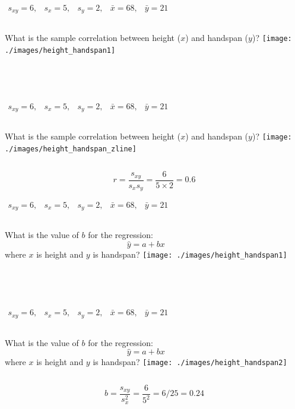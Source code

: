 \documentclass{beamer}
\begin{document}
\begin{frame}

$\begin{array}{ccccc} s_{xy} = 6,&s_x = 5,& s_y = 2,& \bar{x} = 68,& \bar{y} = 21\end{array}$
\begin{columns}[c]
\column{2.5in}
What is the sample correlation between height ($x$) and handspan ($y$)?
\column{1.8in}
\texttt{[image: ./images/height\_handspan1]}
\end{columns}
\alert{$$\phantom{r = \frac{s_{xy}}{s_x s_y} = \frac{6}{4.5\times 2.2} \approx 0.6}$$}
\end{frame}
\begin{frame}
$\begin{array}{ccccc} s_{xy} = 6,&s_x = 5,& s_y = 2,& \bar{x} = 68,& \bar{y} = 21\end{array}$
\begin{columns}[c]
\column{2.5in}
What is the sample correlation between height ($x$) and handspan ($y$)?
\column{1.8in}
\texttt{[image: ./images/height\_handspan\_zline]}
\end{columns}
\alert{$$r = \frac{s_{xy}}{s_x s_y} = \frac{6}{5\times 2} = 0.6$$}
\end{frame}
\begin{frame}
$\begin{array}{ccccc} s_{xy} = 6,&s_x = 5,& s_y = 2,& \bar{x} = 68,& \bar{y} = 21\end{array}$
\begin{columns}[c]
\column{2.5in}
What is the value of $b$ for the regression: $$\hat{y}=a+bx$$
where $x$ is height and $y$ is handspan?
\column{1.8in}
\texttt{[image: ./images/height\_handspan1]}
\end{columns}
\alert{$$\phantom{b = \frac{s_{xy}}{s_x^2} = \frac{6}{(4.5)^2} = 6/20.25 \approx 0.3}$$}
\end{frame}
\begin{frame}
$\begin{array}{ccccc} s_{xy} = 6,&s_x = 5,& s_y = 2,& \bar{x} = 68,& \bar{y} = 21\end{array}$
\begin{columns}[c]
\column{2.5in}
What is the value of $b$ for the regression: $$\hat{y}=a+bx$$
where $x$ is height and $y$ is handspan?
\column{1.8in}
\texttt{[image: ./images/height\_handspan2]}
\end{columns}
\alert{$$b = \frac{s_{xy}}{s_x^2} = \frac{6}{5^2} = 6/25 = 0.24 $$}
\end{frame}
\end{document}
